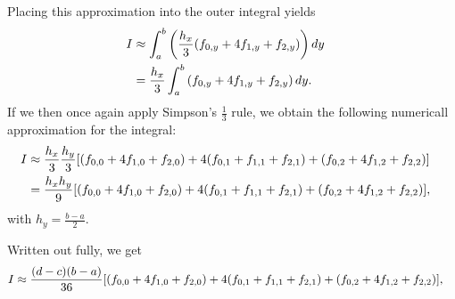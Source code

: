 \documentclass[12pt]{article}
\DeclarePairedDelimiter\rb{(}{)}
\DeclarePairedDelimiter\sqrb{[}{]}
\begin{document}
Placing this approximation into the outer integral yields
\begin{align*}
    I & \approx  \int_{a}^{b} {\rb*{\frac{h_{x}}{3} \rb*{f_{0,y} + 4 f_{1,y} + f_{2,y}}}} \,d y &\\
          & = \frac{h_{x}}{3} \int_{a}^{b} {\rb*{f_{0,y} + 4 f_{1,y} + f_{2,y}}} \,d y. &\\
\end{align*}
If we then once again apply Simpson's \(\frac{1}{3}\) rule, we obtain the following numericall approximation for the integral:
\begin{align*}
    I & \approx \frac{h_{x}}{3} \frac{h_{y}}{3} \sqrb*{
        \rb*{f_{0,0} + 4 f_{1,0} + f_{2,0}} +
        4 \rb*{f_{0,1} + f_{1,1} + f_{2,1}} + 
        \rb*{f_{0,2} + 4 f_{1,2} + f_{2,2}}
    } &\\
    & = \frac{h_{x} h_{y}}{9} 
    \sqrb*{
        \rb*{f_{0,0} + 4 f_{1,0} + f_{2,0}} +
        4 \rb*{f_{0,1} + f_{1,1} + f_{2,1}} + 
        \rb*{f_{0,2} + 4 f_{1,2} + f_{2,2}}
    }, &\\
\end{align*}
with \(h_{y} = \frac{b - a}{2}\).

Written out fully, we get
\begin{align*}
    I & \approx \frac{(d-c)(b-a)}{36}
    \sqrb*{
        \rb*{f_{0,0} + 4 f_{1,0} + f_{2,0}} +
        4 \rb*{f_{0,1} + f_{1,1} + f_{2,1}} + 
        \rb*{f_{0,2} + 4 f_{1,2} + f_{2,2}}
    }, &\\
\end{align*}
\end{document}
